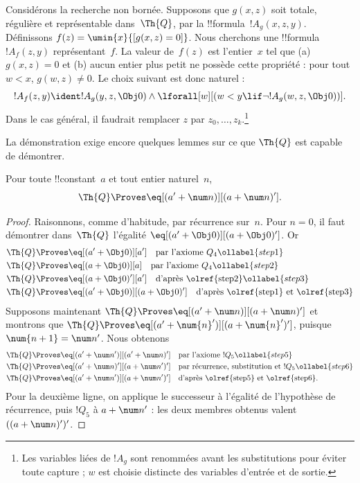 \documentclass[../../../include/open-logic-section]{subfiles}
\begin{document}

Considérons la recherche non bornée. Supposons que $g(x,z)$ soit
totale, régulière et représentable dans~$\Th{Q}$, par la
!!{formula}~$!A_g(x,z,y)$. Définissons
$f(z)=\umin{x}{[g(x,z)=0]}$. Nous cherchons une
!!{formula}~$!A_f(z,y)$ représentant~$f$. La valeur de~$f(z)$
est l'entier~$x$ tel que (a) $g(x,z)=0$ et (b) aucun entier
plus petit ne possède cette propriété : pour tout $w<x$,
$g(w,z)\neq0$. Le choix suivant est donc naturel :
\[
!A_f(z,y) \ident !A_g(y, z, \Obj 0) \land \lforall[w][(w < y \lif \lnot
  !A_g(w, z, \Obj 0))].
\]
Dans le cas général, il faudrait remplacer $z$ par
$z_0,\dots,z_k$.\footnote{Les variables liées de $!A_g$ sont renommées avant les substitutions pour éviter toute capture ; $w$ est choisie distincte des variables d’entrée et de sortie.}

La démonstration exige encore quelques lemmes sur ce que
$\Th{Q}$ est capable de démontrer.

\begin{lem}
Pour toute !!{constant}~$a$ et tout entier naturel~$n$,
\[
\Th{Q} \Proves \eq[(a' + \num n)][(a + \num n)'].
\]
\end{lem}

\begin{proof}
Raisonnons, comme d'habitude, par récurrence sur~$n$. Pour
$n=0$, il faut démontrer dans~$\Th{Q}$ l'égalité
$\eq[(a'+\Obj 0)][(a+\Obj 0)']$. Or
\begin{align}
  \Th{Q} & \Proves \eq[(a' + \Obj 0)][a'] \quad \text{par l'axiome $Q_4$}
  \ollabel{step1}\\
  \Th{Q} & \Proves  \eq[(a + \Obj 0)][a] \quad \text{par l'axiome $Q_4$}
  \ollabel{step2} \\
  \Th{Q} & \Proves \eq[(a + \Obj 0)'][a'] \quad \text{d'après \olref{step2}}
  \ollabel{step3} \\
  \Th{Q} & \Proves \eq[(a' + \Obj 0)][(a + \Obj 0)'] \quad
  \text{d'après \olref{step1} et \olref{step3}}\notag
\end{align}
Supposons maintenant
$\Th{Q}\Proves\eq[(a'+\num n)][(a+\num n)']$ et
montrons que
$\Th{Q}\Proves\eq[(a'+\num{n}')][(a+\num{n}')']$,
puisque $\num{n+1}=\num n'$. Nous obtenons
\begin{align}
  \Th{Q} & \Proves \eq[(a' + \num n')][(a' + \num n)'] \quad
  \text{par l'axiome $!Q_5$} \ollabel{step5}\\
  \Th{Q} & \Proves \eq[(a' + \num n)'][(a + \num n')'] \quad
  \text{par récurrence, substitution et $!Q_5$} \ollabel{step6}\\
  \Th{Q} & \Proves \eq[(a' + \num n')][(a + \num n')'] \quad
  \text{d'après \olref{step5} et \olref{step6}.} \notag
\end{align}
Pour la deuxième ligne, on applique le successeur à l'égalité
de l'hypothèse de récurrence, puis $!Q_5$ à
$a+\num n'$ : les deux membres obtenus valent
$((a+\num n)')'$.
\end{proof}
\end{document}
